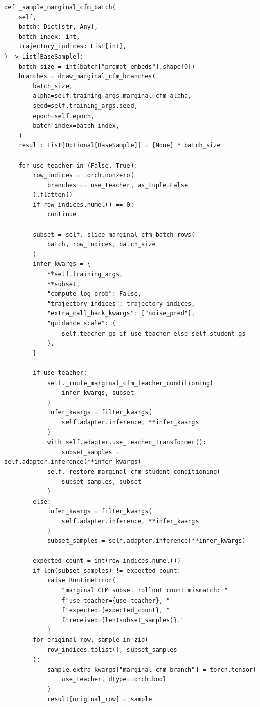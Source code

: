\documentclass[11pt,a4paper]{article}
\theoremstyle{plain}
\theoremstyle{definition}
\begin{document}
\begin{lstlisting}[style=python,caption={Implemented A4 sampling structure, abbreviated.}]
def _sample_marginal_cfm_batch(
    self,
    batch: Dict[str, Any],
    batch_index: int,
    trajectory_indices: List[int],
) -> List[BaseSample]:
    batch_size = int(batch["prompt_embeds"].shape[0])
    branches = draw_marginal_cfm_branches(
        batch_size,
        alpha=self.training_args.marginal_cfm_alpha,
        seed=self.training_args.seed,
        epoch=self.epoch,
        batch_index=batch_index,
    )
    result: List[Optional[BaseSample]] = [None] * batch_size

    for use_teacher in (False, True):
        row_indices = torch.nonzero(
            branches == use_teacher, as_tuple=False
        ).flatten()
        if row_indices.numel() == 0:
            continue

        subset = self._slice_marginal_cfm_batch_rows(
            batch, row_indices, batch_size
        )
        infer_kwargs = {
            **self.training_args,
            **subset,
            "compute_log_prob": False,
            "trajectory_indices": trajectory_indices,
            "extra_call_back_kwargs": ["noise_pred"],
            "guidance_scale": (
                self.teacher_gs if use_teacher else self.student_gs
            ),
        }

        if use_teacher:
            self._route_marginal_cfm_teacher_conditioning(
                infer_kwargs, subset
            )
            infer_kwargs = filter_kwargs(
                self.adapter.inference, **infer_kwargs
            )
            with self.adapter.use_teacher_transformer():
                subset_samples = self.adapter.inference(**infer_kwargs)
            self._restore_marginal_cfm_student_conditioning(
                subset_samples, subset
            )
        else:
            infer_kwargs = filter_kwargs(
                self.adapter.inference, **infer_kwargs
            )
            subset_samples = self.adapter.inference(**infer_kwargs)

        expected_count = int(row_indices.numel())
        if len(subset_samples) != expected_count:
            raise RuntimeError(
                "marginal CFM subset rollout count mismatch: "
                f"use_teacher={use_teacher}, "
                f"expected={expected_count}, "
                f"received={len(subset_samples)}."
            )
        for original_row, sample in zip(
            row_indices.tolist(), subset_samples
        ):
            sample.extra_kwargs["marginal_cfm_branch"] = torch.tensor(
                use_teacher, dtype=torch.bool
            )
            result[original_row] = sample


\end{lstlisting}
\end{document}
